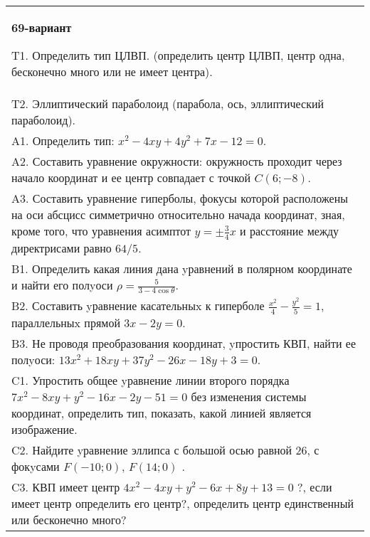 \documentclass{article}
\begin{document}
\begin{tabular}{m{17cm}}
\textbf{69-вариант}
\newline

T1. Определить тип ЦЛВП. (определить центр ЦЛВП, центр одна, бесконечно много или не имеет центра).\\

T2. Эллиптический параболоид (парабола, ось, эллиптический параболоид).\\

A1. Определить тип: $x^{2}-4xy+4y^{2}+7x-12=0$.\\

A2. Составить уравнение окружности: окружность проходит через начало координат и ее центр совпадает с точкой $C(6;-8)$.\\

A3. Составить уравнение гиперболы, фокусы которой расположены на оси абсцисс симметрично относительно начада координат, зная, кроме того, что уравнения асимптот $y=\pm \frac{3}{4}x$ и расстояние между директрисами равно $64/5$.\\

B1. Определить какая линия дана yравнений в полярном координате и найти его полyоси $\rho = \frac{5}{3 - 4\cos\theta}$.  \\

B2. Составить yравнение касательныx к гиперболе $\frac{x^{2}}{4} - \frac{y^{2}}{5} = 1$, параллельныx прямой $3x - 2y = 0$.  \\

B3. Не проводя преобразования координат, yпростить КВП, найти ее полyоси: $13x^{2} + 18xy + 37y^{2} - 26x - 18y + 3 = 0$.  \\

C1. Упростить общее yравнение линии второго порядка $7x^{2}-8xy+y^{2}-16x-2y-51=0$ без изменения системы координат, определить тип, показать, какой линией является изображение.\\

C2. Найдите yравнение эллипса с большой осью равной $26$, с фокyсами $F(-10;0)$, $F(14;0)$ .  \\

C3. КВП имеет центр $4x^{2}-4xy+y^{2}-6x+8y+13=0$ ?, если имеет центр определить его центр?, определить центр единственный или бесконечно много?  \\

\end{tabular}
\vspace{1cm}
\end{document}
